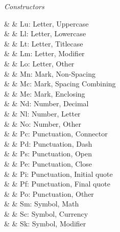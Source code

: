 \begin{haddockdesc}
{\begin{quote}
{\begin{verbatim}
\end{verbatim}}
\end{quote}
\enspace \emph{Constructors}\par
\haddockbeginconstrs
\haddockdecltt{=} &  & Lu: Letter, Uppercase \\
\haddockdecltt{|} &  & Ll: Letter, Lowercase \\
\haddockdecltt{|} &  & Lt: Letter, Titlecase \\
\haddockdecltt{|} &  & Lm: Letter, Modifier \\
\haddockdecltt{|} &  & Lo: Letter, Other \\
\haddockdecltt{|} &  & Mn: Mark, Non-Spacing \\
\haddockdecltt{|} &  & Mc: Mark, Spacing Combining \\
\haddockdecltt{|} &  & Me: Mark, Enclosing \\
\haddockdecltt{|} &  & Nd: Number, Decimal \\
\haddockdecltt{|} &  & Nl: Number, Letter \\
\haddockdecltt{|} &  & No: Number, Other \\
\haddockdecltt{|} &  & Pc: Punctuation, Connector \\
\haddockdecltt{|} &  & Pd: Punctuation, Dash \\
\haddockdecltt{|} &  & Ps: Punctuation, Open \\
\haddockdecltt{|} &  & Pe: Punctuation, Close \\
\haddockdecltt{|} &  & Pi: Punctuation, Initial quote \\
\haddockdecltt{|} &  & Pf: Punctuation, Final quote \\
\haddockdecltt{|} &  & Po: Punctuation, Other \\
\haddockdecltt{|} &  & Sm: Symbol, Math \\
\haddockdecltt{|} &  & Sc: Symbol, Currency \\
\haddockdecltt{|} &  & Sk: Symbol, Modifier \\
}
\end{haddockdesc}
